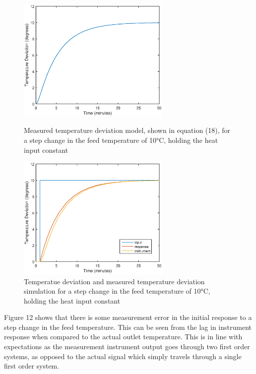 \documentclass{article}
\begin{document}
\begin{figure}[h]
\begin{minipage}{0.45\textwidth}
\centering
\includegraphics[height=6cm]{2_mod}
\caption{Measured temperature deviation model, shown in equation (18), for a step change in the feed temperature of 10$\si{\degreeCelsius}$, holding the heat input constant}
\end{minipage}
\hspace{1cm}
\begin{minipage}{0.45\textwidth}
\centering
\includegraphics[height=6cm]{2_sim}
\caption{Temperatue deviation and measured temperature deviation simulation for a step change in the feed temperature of 10$\si{\degreeCelsius}$, holding the heat input constant}
\end{minipage}
\end{figure}

Figure 12 shows that there is some measurement error in the initial response to a step change in the feed temperature. This can be seen from the lag in instrument response when compared to the actual outlet temperature. This is in line with expectations as the measurement instrument output goes through two first order systems, as opposed to the actual signal which simply travels through a single first order system. 

\end{document}

